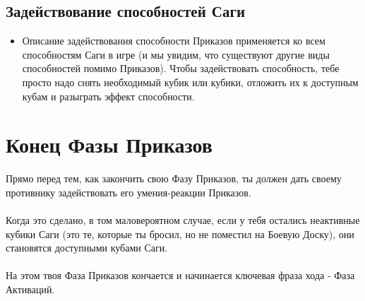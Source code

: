 \documentclass[a4paper,11pt,twoside]{article}
\begin{document}
\subsection*{Задействование способностей Саги}
\begin{itemize}
	\item Описание задействования способности Приказов применяется ко всем способностям Саги в игре (и мы увидим, что существуют другие виды способностей помимо Приказов). Чтобы задействовать способность, тебе просто надо снять необходимый кубик или кубики, отложить их к доступным кубам и разыграть эффект способности.
\end{itemize}

\section*{Конец Фазы Приказов}
Прямо перед тем, как закончить свою Фазу Приказов, ты должен дать своему противнику задействовать его умения-реакции Приказов. \\ \\
Когда это сделано, в том маловероятном случае, если у тебя остались неактивные кубики Саги (это те, которые ты бросил, но не поместил на Боевую Доску), они становятся доступными кубами Саги. \\ \\
На этом твоя Фаза Приказов кончается и начинается ключевая фраза хода - Фаза Активаций. \\ \\ \\
\end{document}
